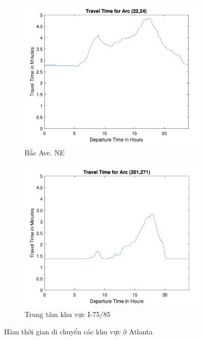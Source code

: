 \documentclass[../main.tex]{subfiles}
\begin{document}
\begin{figure}
\begin{subfigure}{0.5\textwidth}
        \centering
        \includegraphics{edited-images/Figure15c.jpg}
        \caption{Bắc Ave. NE}
        \label{fig:15c}
    \end{subfigure}
    \begin{subfigure}{0.5\textwidth}
        \centering
        \includegraphics{edited-images/Figure15d.jpg}
        \caption{Trung tâm khu vực I-75/85}
        \label{fig:15d}
    \end{subfigure}
    \caption{Hàm thời gian di chuyển các khu vực ở Atlanta}
    \label{fig:15}
\end{figure}
\end{document}
